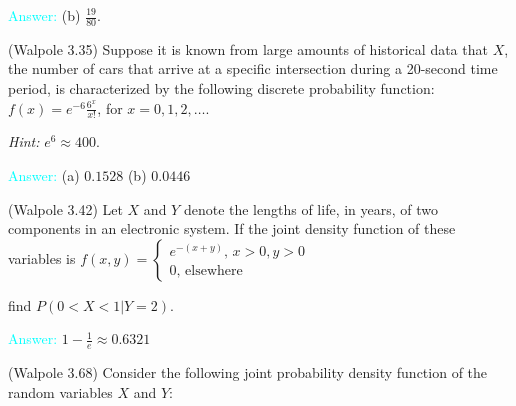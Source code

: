 \documentclass[14pt]{exam}
\begin{document}
\begin{questions}
		
		\textcolor{cyan}{Answer:} (b) $\frac{19}{80}$.
		
		\question
		(Walpole 3.35) Suppose it is known from large amounts of historical data that $X$, the number of cars that arrive at a specific intersection during a 20-second time period, is characterized by the following discrete probability function: $f(x) = e^{-6}\frac{6^x}{x!}$, for $x = 0, 1, 2, \dots$.
		
		
		\textit{Hint:} $e^6 \approx 400$.
		
		\textcolor{cyan}{Answer:} (a) $0.1528$ (b) $0.0446$
		
		\question
		(Walpole 3.42)  Let $X$ and $Y$ denote the lengths of life, in years, of two components in an electronic system. If the joint density function of these variables is $f(x, y) = \begin{cases}
			e^{-(x+y)},\, x > 0, y > 0\\
			0,\, \text{elsewhere}
		\end{cases}$
		
		find $P(0 < X < 1 | Y = 2)$.
		
		\textcolor{cyan}{Answer:} $1 - \frac{1}{e} \approx 0.6321$
		
		\question
		(Walpole 3.68)  Consider the following joint probability density
		function of the random variables $X$ and $Y$:
		

\end{questions}
\end{document}
